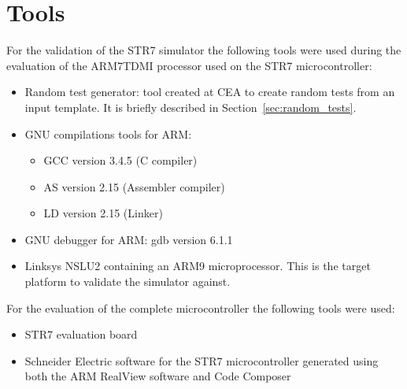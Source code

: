 \section{Tools}
\label{sec:tools}

For the validation of the STR7 simulator the following tools were used during the evaluation of the ARM7TDMI processor used on the STR7 microcontroller:
\begin{itemize}
	\item Random test generator: tool created at CEA to create random tests from an input template. It is briefly described in Section~\ref{sec:random_tests}.
	\item GNU compilations tools for ARM:
	\begin{itemize}
		\item GCC version 3.4.5 (C compiler)
		\item AS version 2.15 (Assembler compiler)
		\item LD version 2.15 (Linker)
	\end{itemize}
	\item GNU debugger for ARM: gdb version 6.1.1
	\item Linksys NSLU2 containing an ARM9 microprocessor. This is the target platform to validate the simulator against.
\end{itemize}

For the evaluation of the complete microcontroller the following tools were used:
\begin{itemize}
	\item STR7 evaluation board
	\item Schneider Electric software for the STR7 microcontroller generated using both the ARM RealView software and Code Composer
\end{itemize}
